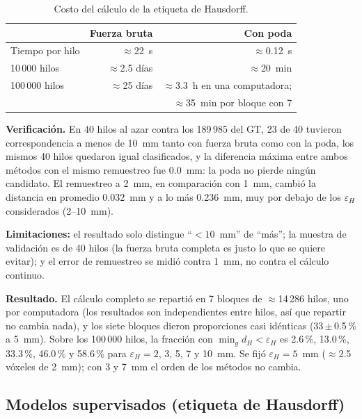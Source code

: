 \documentclass[11pt,a4paper]{article}
\newcommand{\eps}{\varepsilon}
\begin{document}
\begin{table}[H]
\centering
\small
\begin{tabular}{@{}lrr@{}}
\toprule
 & \textbf{Fuerza bruta} & \textbf{Con poda}\\
\midrule
Tiempo por hilo        & $\approx$22~s       & $\approx$0.12~s\\
10\,000 hilos          & $\approx$2.5 d\'ias & $\approx$20~min\\
100\,000 hilos         & $\approx$25 d\'ias  & $\approx$3.3~h en una computadora;\\
                       &                     & $\approx$35~min por bloque con 7\\
\bottomrule
\end{tabular}
\caption{Costo del c\'alculo de la etiqueta de Hausdorff.}
\label{tab:haus}
\end{table}

\textbf{Verificaci\'on.} En 40 hilos al azar contra los 189\,985 del GT, 23 de 40 tuvieron
correspondencia a menos de 10~mm tanto con fuerza bruta como con la poda, los mismos 40
hilos quedaron igual clasificados, y la diferencia m\'axima entre ambos m\'etodos con el mismo
remuestreo fue 0.0~mm: la poda no pierde ning\'un candidato. El remuestreo a 2~mm, en
comparaci\'on con 1~mm, cambi\'o la distancia en promedio 0.032~mm y a lo m\'as 0.236~mm, muy por
debajo de los $\eps_H$ considerados (2--10~mm). 


\textbf{Limitaciones:} el resultado solo
distingue ``$<10$~mm'' de ``m\'as''; la muestra de validaci\'on es de 40 hilos (la fuerza bruta
completa es justo lo que se quiere evitar); y el error de remuestreo se midi\'o contra 1~mm,
no contra el c\'alculo continuo.

\textbf{Resultado.} El c\'alculo completo se reparti\'o en 7 bloques de $\approx$14\,286 hilos,
uno por computadora (los resultados son independientes entre hilos, as\'i que repartir no
cambia nada), y los siete bloques dieron proporciones casi id\'enticas (33\,$\pm$\,0.5\,\% a
5~mm). Sobre los 100\,000 hilos, la fracci\'on con $\min_g d_H<\eps_H$ es 2.6\,\%, 13.0\,\%,
33.3\,\%, 46.0\,\% y 58.6\,\% para $\eps_H=2$, 3, 5, 7 y 10~mm. Se fij\'o $\eps_H=5$~mm
($\approx$2.5 v\'oxeles de 2~mm); con 3 y 7~mm el orden de los m\'etodos no cambia.

\subsection{Modelos supervisados (etiqueta de Hausdorff)}
\label{sec:modelos-res}
\end{document}
